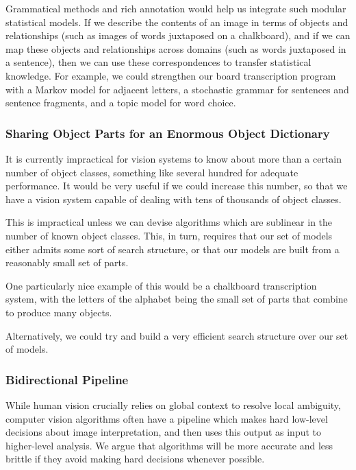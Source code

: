 \documentclass{article}
\begin{document}
Grammatical methods and rich annotation would help us integrate such
modular statistical models. If we describe the contents of an image in
terms of objects and relationships (such as images of words juxtaposed
on a chalkboard), and if we can map these objects and relationships
across domains (such as words juxtaposed in a sentence), then we can
use these correspondences to transfer statistical knowledge. For
example, we could strengthen our board transcription program with a
Markov model for adjacent letters, a stochastic grammar for sentences
and sentence fragments, and a topic model for word choice.

\subsubsection{Sharing Object Parts for an Enormous Object Dictionary}

It is currently impractical for vision systems to know about more than
a certain number of object classes, something like several hundred for
adequate performance. It would be very useful if we could increase
this number, so that we have a vision system capable of dealing with
tens of thousands of object classes.

This is impractical unless we can devise algorithms which are
sublinear in the number of known object classes. This, in turn,
requires that our set of models either admits some sort of search
structure, or that our models are built from a reasonably small set of
parts.

One particularly nice example of this would be a chalkboard
transcription system, with the letters of the alphabet being the small
set of parts that combine to produce many objects.

Alternatively, we could try and build a very efficient search
structure over our set of models.

\subsubsection{Bidirectional Pipeline}

While human vision crucially relies on global context to resolve local
ambiguity, computer vision algorithms often have a pipeline which
makes hard low-level decisions about image interpretation, and then
uses this output as input to higher-level analysis. We argue that
algorithms will be more accurate and less brittle if they avoid making
hard decisions whenever possible.
\end{document}
